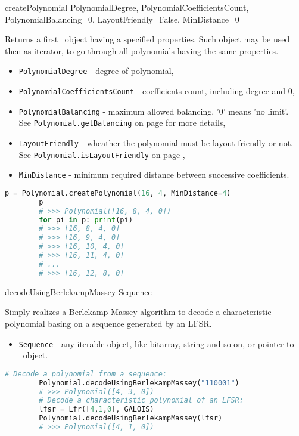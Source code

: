  {createPolynomial} {PolynomialDegree, PolynomialCoefficientsCount, PolynomialBalancing=0, LayoutFriendly=False, MinDistance=0} {
	Returns a first \Polynomial\ object having a specified properties. Such object may be used then as iterator, to go through all polynomials having the same properties.
	\begin{itemize}
		\item \texttt{PolynomialDegree} - degree of polynomial,
		\item \texttt{PolynomialCoefficientsCount} - coefficients count, including degree and 0,
		\item \texttt{PolynomialBalancing} - maximum allowed balancing. '0' means 'no limit'. \\See \texttt{Polynomial.getBalancing} on page \pageref{polynomial:getbalancing} for more details,
		\item \texttt{LayoutFriendly} - wheather the polynomial must be layout-friendly or not. \\See \texttt{Polynomial.isLayoutFriendly} on page \pageref{polynomial:islayoutfriendly},
		\item \texttt{MinDistance} - minimum required distance between successive coefficients.
	\end{itemize}
}
\begin{lstlisting}[language=Python]
		p = Polynomial.createPolynomial(16, 4, MinDistance=4)
		p
		# >>> Polynomial([16, 8, 4, 0])
		for pi in p: print(pi)
		# >>> [16, 8, 4, 0]
		# >>> [16, 9, 4, 0]
		# >>> [16, 10, 4, 0]
		# >>> [16, 11, 4, 0]
		# ...
		# >>> [16, 12, 8, 0]
\end{lstlisting}

 {decodeUsingBerlekampMassey} {Sequence} {
	Simply realizes a Berlekamp-Massey algorithm to decode a characteristic polynomial basing on a sequence generated by an LFSR.
	\begin{itemize}
		\item \texttt{Sequence} - any iterable object, like bitarray, string and so on, or pointer to \Lfsr\ object.	\end{itemize}
}
\begin{lstlisting}[language=Python]
		# Decode a polynomial from a sequence:
		Polynomial.decodeUsingBerlekampMassey("110001")
		# >>> Polynomial([4, 3, 0])
		# Decode a characteristic polynomial of an LFSR:
		lfsr = Lfr([4,1,0], GALOIS)
		Polynomial.decodeUsingBerlekampMassey(lfsr)
		# >>> Polynomial([4, 1, 0])
\end{lstlisting}

